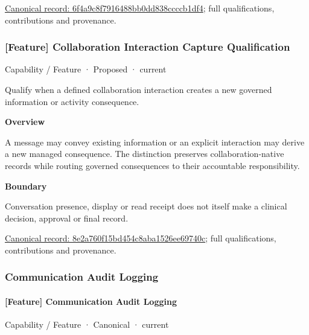 {\footnotesize \href{../../../../continuum/strategy/capability/feature/6f4a9c8f7916488bb0dd838ccccb1df4.md}{Canonical record: 6f4a9c8f7916488bb0dd838ccccb1df4}; full qualifications, contributions and provenance.}\par
\subsubsection{[Feature] Collaboration Interaction Capture Qualification}

\label{element:8e2a760f15bd454c8aba1526ee69740c}
{\small Capability / Feature · Proposed · current}\par

Qualify when a defined collaboration interaction creates a new governed information or activity consequence.



\textbf{Overview}



A message may convey existing information or an explicit interaction may derive a new managed consequence. The distinction preserves collaboration-native records while routing governed consequences to their accountable responsibility.



\textbf{Boundary}



Conversation presence, display or read receipt does not itself make a clinical decision, approval or final record.


{\footnotesize \href{../../../../continuum/strategy/capability/feature/8e2a760f15bd454c8aba1526ee69740c.md}{Canonical record: 8e2a760f15bd454c8aba1526ee69740c}; full qualifications, contributions and provenance.}\par
\subsubsection{Communication Audit Logging}

\paragraph{[Feature] Communication Audit Logging}

\label{element:b9df49b2f221486392f5cc393369d888}
{\small Capability / Feature · Canonical · current}\par


